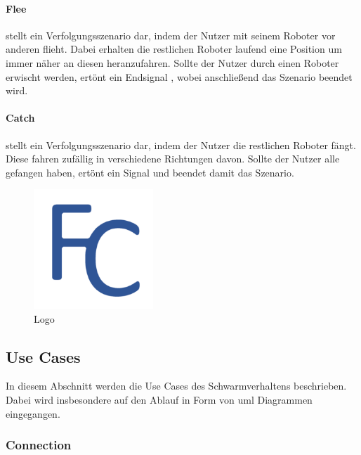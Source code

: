 \paragraph{Flee}

stellt ein Verfolgungsszenario dar, indem der Nutzer mit seinem Roboter vor anderen flieht. Dabei erhalten die restlichen Roboter laufend eine Position um immer näher an diesen heranzufahren. Sollte der Nutzer durch einen Roboter erwischt werden, ertönt ein Endsignal , wobei anschließend das Szenario beendet wird.

\paragraph{Catch}

stellt ein Verfolgungsszenario dar, indem der Nutzer die restlichen Roboter fängt. Diese fahren zufällig in verschiedene Richtungen davon. Sollte der Nutzer alle gefangen haben, ertönt ein Signal und beendet damit das Szenario.

\begin{figure}[h]
	\begin{center}
		\includegraphics[width=0.4\textwidth]{images/logos/UWP/FleeAndCatch_Logo.png}
	\end{center}
	\caption{Logo}
	\label{fig:Logo}
\end{figure}

\newpage
\subsection{Use Cases}

In diesem Abschnitt werden die Use Cases des Schwarmverhaltens beschrieben. Dabei wird insbesondere auf den Ablauf in Form von \gls{uml} Diagrammen eingegangen.

\subsubsection{Connection}

